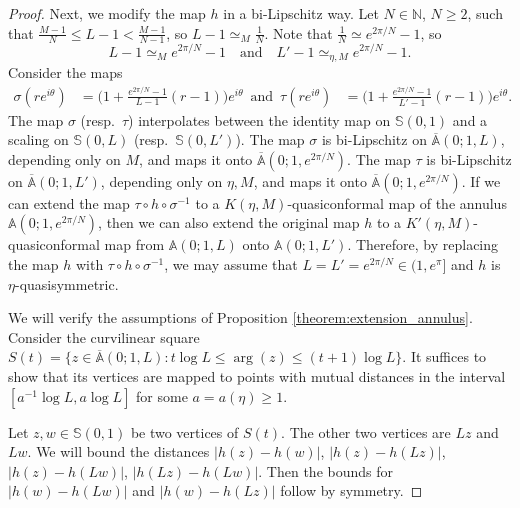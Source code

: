 \documentclass[10pt,a4paper]{amsart}
\newcommand{\N}{\mathbb N}
\renewcommand{\bar}{\overline}
\begin{document}
\begin{proof}
Next, we modify the map $h$ in a bi-Lipschitz way. Let $N\in \N$, $N\geq 2$, such that $\frac{M-1}{N}\leq  L-1<\frac{M-1}{N-1}$, so $L-1\simeq_M\frac{1}{N}$. Note that $\frac{1}{N}\simeq e^{2\pi/N}-1$, so  
$$L-1\simeq_{M} e^{2\pi/N}-1\quad \text{and}\quad L'-1\simeq_{\eta,M}e^{2\pi/N}-1.$$
Consider the maps
\begin{align*}
\sigma(re^{i\theta}) &= \bigg(1+ \frac{e^{2\pi/N}-1}{L-1}(r-1)\bigg) e^{i\theta}\,\,\, \text{and} \,\,\, \tau(re^{i\theta}) &= \bigg(1+ \frac{e^{2\pi/N}-1}{L'-1}(r-1) \bigg) e^{i\theta}.
\end{align*}
The map $\sigma$ (resp.\ $\tau$) interpolates between the identity map on $\mathbb S(0,1)$ and a scaling on $\mathbb S(0,L)$ (resp.\ $\mathbb S(0,L')$). The map $\sigma$ is  bi-Lipschitz on $\bar{ \mathbb A}(0;1,L)$, depending only on $M$, and maps it onto $\bar{\mathbb A}(0;1,e^{2\pi/N})$. The map $\tau$ is bi-Lipschitz on $\bar{ \mathbb A}(0;1,L')$, depending only on $\eta,M$, and maps it onto $\bar{\mathbb A}(0;1,e^{2\pi/N})$. If we can extend the map $\tau \circ h\circ \sigma^{-1}$ to a $K(\eta,M)$-quasiconformal map of the annulus $\mathbb A(0;1,e^{2\pi/N})$, then we can also extend the original map $h$ to a $K'(\eta,M)$-quasiconformal map from $\mathbb A(0;1,L)$ onto $\mathbb A(0;1,L')$. Therefore, by replacing the map $h$ with $\tau \circ h\circ \sigma^{-1}$, we may assume that $L=L'=e^{2\pi/N}\in (1,e^{\pi}]$ and $h$ is $\eta$-quasisymmetric.

We will verify the assumptions of Proposition \ref{theorem:extension_annulus}. Consider the curvilinear square $S(t)=\{z\in \bar {\mathbb A}(0;1,L): t\log L\leq   \arg(z)\leq (t+1)\log L\}$. It suffices to show that its vertices are mapped to points with mutual distances in the interval $[a^{-1}\log L, a\log L]$ for some $a=a(\eta)\geq 1$.

Let $z,w\in \mathbb S(0,1)$ be two vertices of $S(t)$. The other two vertices are $Lz$ and $Lw$. We will bound the distances $|h(z)-h(w)|$, $|h(z)-h(Lz)|$, $|h(z)-h(Lw)|$, $|h(Lz)-h(Lw)|$. Then the bounds for $|h(w)-h(Lw)|$ and $|h(w)-h(Lz)|$ follow by symmetry. 


\end{proof}
\end{document}
